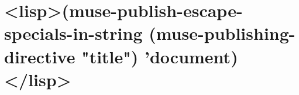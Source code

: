 \documentclass{article}
\begin{document}
\section*{<lisp>(muse-publish-escape-specials-in-string  
(muse-publishing-directive "title") 'document)</lisp>}


\end{document}
